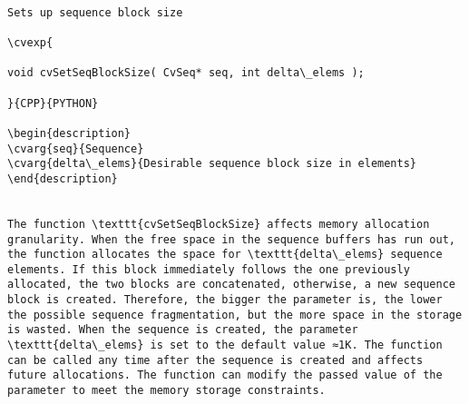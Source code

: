 \begin{verbatim}

Sets up sequence block size

\cvexp{

void cvSetSeqBlockSize( CvSeq* seq, int delta\_elems );

}{CPP}{PYTHON}

\begin{description}
\cvarg{seq}{Sequence}
\cvarg{delta\_elems}{Desirable sequence block size in elements}
\end{description}


The function \texttt{cvSetSeqBlockSize} affects memory allocation granularity. When the free space in the sequence buffers has run out, the function allocates the space for \texttt{delta\_elems} sequence elements. If this block immediately follows the one previously allocated, the two blocks are concatenated, otherwise, a new sequence block is created. Therefore, the bigger the parameter is, the lower the possible sequence fragmentation, but the more space in the storage is wasted. When the sequence is created, the parameter \texttt{delta\_elems} is set to the default value ≈1K. The function can be called any time after the sequence is created and affects future allocations. The function can modify the passed value of the parameter to meet the memory storage constraints.


\end{verbatim}
